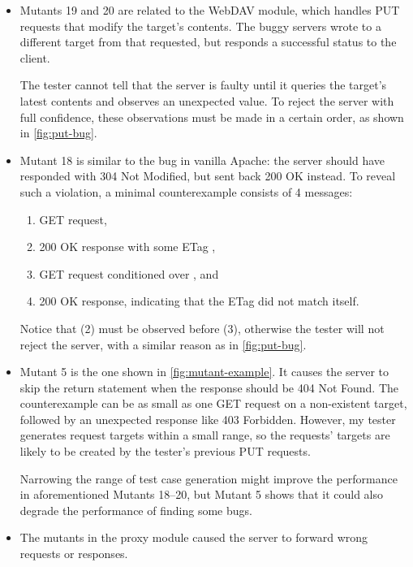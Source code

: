 \begin{itemize}
  \item Mutants 19 and 20 are related to the WebDAV module, which handles PUT
    requests that modify the target's contents.  The buggy servers wrote to a
    different target from that requested, but responds a successful status to
    the client.

    The tester cannot tell that the server is faulty until it queries the
    target's latest contents and observes an unexpected value.  To reject the
    server with full confidence, these observations must be made in a certain
    order, as shown in \autoref{fig:put-bug}.

  \item Mutant 18 is similar to the bug in vanilla Apache: the server should
    have responded with 304 Not Modified, but sent back 200 OK instead.  To
    reveal such a violation, a minimal counterexample consists of 4 messages:
    \begin{enumerate}
    \item GET request,
    \item 200 OK response with some ETag ,
    \item GET request conditioned over , and
    \item 200 OK response, indicating that the ETag  did not match
      itself.
    \end{enumerate}
    Notice that (2) must be observed before (3), otherwise the tester will not
    reject the server, with a similar reason as in \autoref{fig:put-bug}.

  \item Mutant 5 is the one shown in \autoref{fig:mutant-example}.  It causes
    the server to skip the return statement when the response should be 404 Not
    Found.  The counterexample can be as small as one GET request on a
    non-existent target, followed by an unexpected response like 403
    Forbidden.  However, my tester generates request targets within a small
    range, so the requests' targets are likely to be created by the tester's
    previous PUT requests.

    Narrowing the range of test case generation might improve the performance in
    aforementioned Mutants 18--20, but Mutant 5 shows that it could also degrade
    the performance of finding some bugs.

  \item The mutants in the proxy module caused the server to forward wrong
    requests or responses.


\end{itemize}
